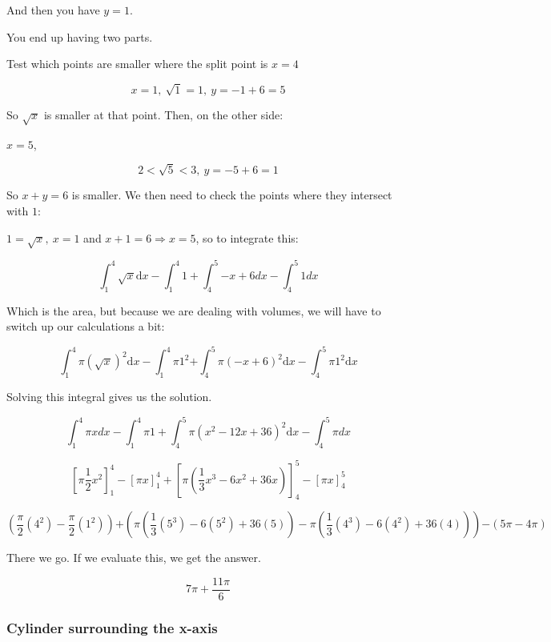 \documentclass[12pt]{article}
\theoremstyle{plain}
\theoremstyle{remark}
\theoremstyle{definition}
\begin{document}
And then you have \(y = 1\).


You end up having two parts.

Test which points are smaller where the split point is \(x = 4\)


\[x = 1,\ \sqrt{1} = 1,\ y = - 1 + 6 = 5\]

So \(\sqrt{x}\) is smaller at that point. Then, on the other side:

\(x = 5\),

\[2 < \sqrt{5} < 3,\ y = - 5 + 6 = 1\]

So \(x + y = 6\) is smaller. We then need to check the points where they
intersect with \(1\):

\(1 = \sqrt{x},\ x = 1\) and \(x + 1 = 6 \Rightarrow x = 5\), so to
integrate this:

\[\int_{1}^{4}{\sqrt{x}\text{d}x} - \int_{1}^{4}1 + \int_{4}^{5}{- x + 6dx} - \int_{4}^{5}{1dx}\]

Which is the area, but because we are dealing with volumes, we will have
to switch up our calculations a bit:

\[{\int_{1}^{4}{\pi\left( \sqrt{x} \right)^{2}\text{d}x} - \int_{1}^{4}{\pi 1^{2}} }{+ \int_{4}^{5}{\pi( - x + 6)^{2}\text{d}x} - \int_{4}^{5}{\pi 1^{2}\text{d}x}} \]

Solving this integral gives us the solution.

\[\int_{1}^{4}\pi xdx - \int_{1}^{4}{\pi 1} + \int_{4}^{5}{\pi\left( x^{2} - 12x + 36 \right)^{2}\text{d}x} - \int_{4}^{5}\pi dx\]

\[\left\lbrack \pi\frac{1}{2}x^{2} \right\rbrack_{1}^{4} - \left\lbrack \pi x \right\rbrack_{1}^{4} + \left\lbrack \pi\left( \frac{1}{3}x^{3} - 6x^{2} + 36x \right) \right\rbrack_{4}^{5} - \left\lbrack \pi x \right\rbrack_{4}^{5}\]

\[{\left( \frac{\pi}{2}\left( 4^{2} \right) - \frac{\pi}{2}\left( 1^{2} \right) \right) }{+ \left( \pi\left( \frac{1}{3}\left( 5^{3} \right) - 6\left( 5^{2} \right) + 36(5) \right) - \pi\left( \frac{1}{3}\left( 4^{3} \right) - 6\left( 4^{2} \right) + 36(4) \right) \right) }{- (5\pi - 4\pi)} \]

There we go. If we evaluate this, we get the answer.

\[7\pi + \frac{11\pi}{6}\]


\subsubsection{Cylinder surrounding the
x-axis}
\end{document}
